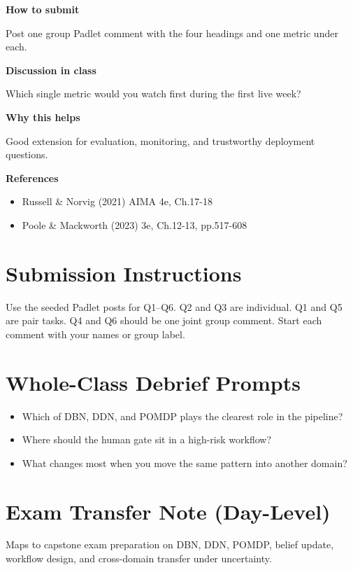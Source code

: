 \documentclass[11pt]{article}
\providecommand{\tightlist}{\setlength{\itemsep}{0pt}\setlength{\parskip}{0pt}}
\begin{document}
\begin{tcolorbox}[colback=white,colframe=MidnightBlue,title={Q6 Stretch Extension},fonttitle=\bfseries,breakable]
{\large\bfseries\color{MidnightBlue} How to submit}\par\medskip
Post one group Padlet comment with the four headings and one metric under each.

{\large\bfseries\color{MidnightBlue} Discussion in class}\par\medskip
Which single metric would you watch first during the first live week?

{\large\bfseries\color{MidnightBlue} Why this helps}\par\medskip
Good extension for evaluation, monitoring, and trustworthy deployment questions.

{\large\bfseries\color{MidnightBlue} References}\par\medskip
\begin{itemize}\item Russell \& Norvig (2021) AIMA 4e, Ch.17-18
\item Poole \& Mackworth (2023) 3e, Ch.12-13, pp.517-608\end{itemize}
\end{tcolorbox}

\section*{Submission Instructions}

Use the seeded Padlet posts for Q1--Q6. Q2 and Q3 are individual. Q1 and Q5 are pair tasks. Q4 and Q6 should be one joint group comment. Start each comment with your names or group label.

\section*{Whole-Class Debrief Prompts}

\begin{itemize}
\tightlist
\item
  Which of DBN, DDN, and POMDP plays the clearest role in the pipeline?
\item
  Where should the human gate sit in a high-risk workflow?
\item
  What changes most when you move the same pattern into another domain?
\end{itemize}

\section*{Exam Transfer Note (Day-Level)}

Maps to capstone exam preparation on DBN, DDN, POMDP, belief update, workflow design, and cross-domain transfer under uncertainty.
\end{document}
